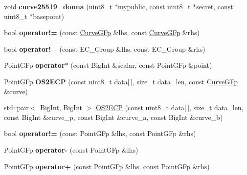 \begin{DoxyCompactItemize}
void {\bfseries curve25519\+\_\+donna} (uint8\+\_\+t $\ast$mypublic, const uint8\+\_\+t $\ast$secret, const uint8\+\_\+t $\ast$basepoint)
\item 
\mbox{\label{namespace_botan_a0dd2cd53144b9dd0eafcf6f8d0c5d3a1}} 
bool {\bfseries operator!=} (const \mbox{\hyperlink{class_botan_1_1_curve_g_fp}{Curve\+G\+Fp}} \&lhs, const \mbox{\hyperlink{class_botan_1_1_curve_g_fp}{Curve\+G\+Fp}} \&rhs)
\item 
\mbox{\label{namespace_botan_a4d0a0af0ddf73a8188e0773592b994db}} 
bool {\bfseries operator!=} (const E\+C\+\_\+\+Group \&lhs, const E\+C\+\_\+\+Group \&rhs)
\item 
\mbox{\label{namespace_botan_a8f3c371fa5a447f50ee58bd9b3f127e1}} 
Point\+G\+Fp {\bfseries operator$\ast$} (const Big\+Int \&scalar, const Point\+G\+Fp \&point)
\item 
\mbox{\label{namespace_botan_a15cd2fb9f54c4ab5c16033767480ca43}} 
Point\+G\+Fp {\bfseries O\+S2\+E\+CP} (const uint8\+\_\+t data\mbox{[}$\,$\mbox{]}, size\+\_\+t data\+\_\+len, const \mbox{\hyperlink{class_botan_1_1_curve_g_fp}{Curve\+G\+Fp}} \&curve)
\item 
std\+::pair$<$ Big\+Int, Big\+Int $>$ \mbox{\hyperlink{namespace_botan_aa477faffd5421eda38e1760113cd52a5}{O\+S2\+E\+CP}} (const uint8\+\_\+t data\mbox{[}$\,$\mbox{]}, size\+\_\+t data\+\_\+len, const Big\+Int \&curve\+\_\+p, const Big\+Int \&curve\+\_\+a, const Big\+Int \&curve\+\_\+b)
\item 
\mbox{\label{namespace_botan_ac92cb68537b7bb61311f7b214c6a01ca}} 
bool {\bfseries operator!=} (const Point\+G\+Fp \&lhs, const Point\+G\+Fp \&rhs)
\item 
\mbox{\label{namespace_botan_a3ec2a919f0d3e9a53b081f3647ef0831}} 
Point\+G\+Fp {\bfseries operator-\/} (const Point\+G\+Fp \&lhs)
\item 
\mbox{\label{namespace_botan_ac3cb3ef72a835fa7742d7514a4aedab1}} 
Point\+G\+Fp {\bfseries operator+} (const Point\+G\+Fp \&lhs, const Point\+G\+Fp \&rhs)
\item 
\mbox{\label{namespace_botan_aa7e066f87e0618c623684de6276d71fe}} 

\end{DoxyCompactItemize}
